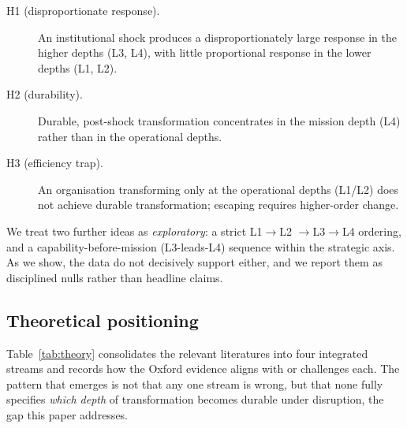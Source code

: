 \documentclass[11pt]{article}
\begin{document}
\begin{description}
\item[H1 (disproportionate response).] An institutional shock produces a disproportionately
large response in the higher depths (L3, L4), with little proportional response in the lower
depths (L1, L2).
\item[H2 (durability).] Durable, post-shock transformation concentrates in the mission depth
(L4) rather than in the operational depths.
\item[H3 (efficiency trap).] An organisation transforming only at the operational depths
(L1/L2) does not achieve durable transformation; escaping requires higher-order change.
\end{description}

\noindent We treat two further ideas as \emph{exploratory}: a strict L1$\rightarrow$L2
$\rightarrow$L3$\rightarrow$L4 ordering, and a capability-before-mission (L3-leads-L4) sequence
within the strategic axis. As we show, the data do not decisively support either, and we report
them as disciplined nulls rather than headline claims.

\subsection{Theoretical positioning}

Table~\ref{tab:theory} consolidates the relevant literatures into four integrated streams and
records how the Oxford evidence aligns with or challenges each. The pattern that emerges is not
that any one stream is wrong, but that none fully specifies \emph{which depth} of transformation
becomes durable under disruption, the gap this paper addresses.
\end{document}
